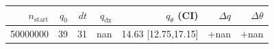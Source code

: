 \begin{tabular}{r r r r r r r}
\hline
$n_{\mathrm{start}}$ & $q_0$ & $dt$ & $q_{\mathrm{dx}}$ & $q_{\theta}$ (CI) & $\Delta q$ & $\Delta\theta$ \\
\hline
50000000 & 39 & 31 & nan & 14.63 [12.75,17.15] & +nan & +nan \\
\hline
\end{tabular}
